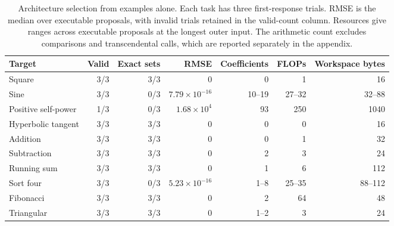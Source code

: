 \begin{table}[htbp]\centering\small
\caption{Architecture selection from examples alone. Each task has three first-response trials. RMSE is the median over executable proposals, with invalid trials retained in the valid-count column. Resources give ranges across executable proposals at the longest outer input. The arithmetic count excludes comparisons and transcendental calls, which are reported separately in the appendix.}\label{tab:architecture_search}
\setlength{\tabcolsep}{2.5pt}
\begin{tabular}{@{}lrrrrrr@{}}\toprule
Target & Valid & Exact sets & RMSE & Coefficients & FLOPs & Workspace bytes\\\midrule
Square & 3/3 & 3/3 & 0 & 0 & 1 & 16\\
Sine & 3/3 & 0/3 & $7.79\times10^{-16}$ & 10--19 & 27--32 & 32--88\\
Positive self-power & 1/3 & 0/3 & $1.68\times10^{4}$ & 93 & 250 & 1040\\
Hyperbolic tangent & 3/3 & 3/3 & 0 & 0 & 0 & 16\\
Addition & 3/3 & 3/3 & 0 & 0 & 1 & 32\\
Subtraction & 3/3 & 3/3 & 0 & 2 & 3 & 24\\
Running sum & 3/3 & 3/3 & 0 & 1 & 6 & 112\\
Sort four & 3/3 & 0/3 & $5.23\times10^{-16}$ & 1--8 & 25--35 & 88--112\\
Fibonacci & 3/3 & 3/3 & 0 & 2 & 64 & 48\\
Triangular & 3/3 & 3/3 & 0 & 1--2 & 3 & 24\\
\bottomrule\end{tabular}\end{table}
